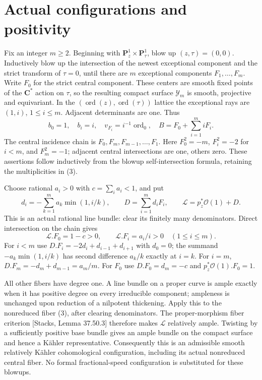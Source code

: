 \documentclass[11pt]{article}
\newcommand{\ord}{\operatorname{ord}}
\begin{document}
\section{Actual configurations and positivity}
Fix an integer $m\geq2$. Beginning with
$\mathbf P^1_z\times\mathbf P^1_\tau$, blow up $(z,\tau)=(0,0)$.
Inductively blow up the intersection of the newest exceptional component
and the strict transform of $\tau=0$, until there are $m$ exceptional
components $F_1,\ldots,F_m$. Write $F_0$ for the strict central component.
These centers are smooth fixed points of the $\mathbf C^*$ action on
$\tau$, so the resulting compact surface $\mathcal Y_m$ is smooth,
projective and equivariant. In the $(\ord(z),\ord(\tau))$ lattice the
exceptional rays are $(1,i)$, $1\leq i\leq m$. Adjacent determinants
are one. Thus
\[
 b_0=1,\quad b_i=i,\quad v_{F_i}=i^{-1}\ord_0,\quad
 B=F_0+\sum_{i=1}^m iF_i .                              \tag{3}
\]
The central incidence chain is $F_0,F_m,F_{m-1},\ldots,F_1$.
Here $F_0^2=-m$, $F_i^2=-2$ for $i<m$, and $F_m^2=-1$;
adjacent central intersections are one, others zero. These assertions
follow inductively from the blowup self-intersection formula, retaining
the multiplicities in (3).

Choose rational $a_i>0$ with $c=\sum_i a_i<1$, and put
\[
 d_i=-\sum_{k=1}^m a_k\min(1,i/k),\qquad
 D=\sum_{i=1}^m d_iF_i,\qquad
 \mathcal L=p_z^*\mathcal O(1)+D.                        \tag{4}
\]
This is an actual rational line bundle: clear its finitely many
denominators. Direct intersection on the chain gives
\[
 \mathcal L.F_0=1-c>0,\qquad
 \mathcal L.F_i=a_i/i>0\quad(1\leq i\leq m).             \tag{5}
\]
For $i<m$ use $D.F_i=-2d_i+d_{i-1}+d_{i+1}$ with $d_0=0$;
the summand $-a_k\min(1,i/k)$ has second difference $a_k/k$ exactly
at $i=k$. For $i=m$, $D.F_m=-d_m+d_{m-1}=a_m/m$.
For $F_0$ use $D.F_0=d_m=-c$ and $p_z^*\mathcal O(1).F_0=1$.

All other fibers have degree one. A line bundle on a proper curve is
ample exactly when it has positive degree on every irreducible component;
ampleness is unchanged upon reduction of a nilpotent thickening. Apply
this to the nonreduced fiber (3), after clearing denominators.
The proper-morphism fiber criterion [Stacks, Lemma 37.50.3] therefore
makes $\mathcal L$ relatively ample. Twisting by a sufficiently positive
base bundle gives an ample bundle on the compact surface and hence
a K\"ahler representative. Consequently this is an admissible smooth
relatively K\"ahler cohomological configuration, including its actual
nonreduced central fiber. No formal fractional-speed configuration is
substituted for these blowups.
\end{document}
